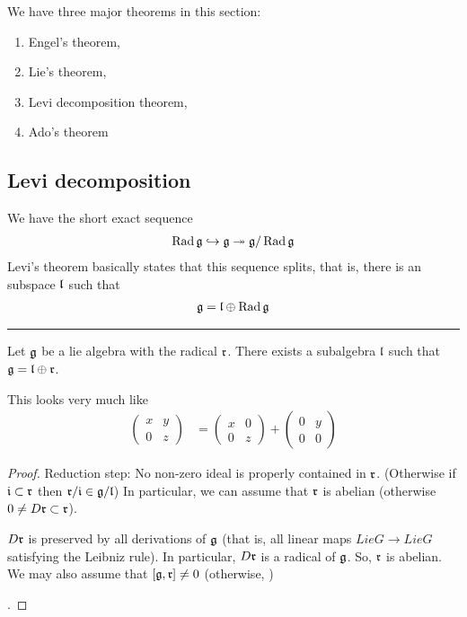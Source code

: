 We have three major theorems in this section:
\begin{enumerate}
    \makethislistcompact
    \item Engel's theorem,
    \item Lie's theorem,
    \item Levi decomposition theorem,
    \item Ado's theorem
\end{enumerate}

\subsection{Levi decomposition}
\label{sub:levi_decomposition}

We have the short exact sequence
\begin{align}
    \operatorname{Rad} \mathfrak{g} \hookrightarrow \mathfrak{g} \twoheadrightarrow \mathfrak{g}/\operatorname{Rad}\mathfrak{g}
\end{align}
Levi's theorem basically states that this sequence splits, that is, there is an subspace $\Lie{l}$ such that
\begin{align}
    \LieG = \Lie{l}\oplus\Rad\LieG
\end{align}

\hrule\vspace{1em}

\begin{theorem}
   Let $\mathfrak{g}$  be a lie algebra with the radical $\Lie r$. There exists a subalgebra $\Lie l$ such that $\Lie g = \Lie l \oplus \Lie r$.
\end{theorem}
\begin{insight}
    This looks very much like 
    \begin{align}
        \begin{pmatrix}  x& y \\ 0 & z \end{pmatrix} &= \begin{pmatrix} x & 0 \\ 0 & z \end{pmatrix} + \begin{pmatrix} 0 & y \\ 0 & 0  \end{pmatrix}
    \end{align} 
\end{insight}
\begin{proof}
    Reduction step: No non-zero ideal is properly contained in $\Lie r$. (Otherwise if $\Lie i\subset \Lie r$ then $\Lie r/\Lie i \in \Lie g/ \Lie l$) 
     In particular, we can assume that $\Lie r $ is abelian (otherwise $0\neq D\Lie r\subset \Lie r$).

     $D\Lie r$ is preserved by all derivations of $\mathfrak{g}$ (that is, all linear maps $LieG\to LieG$ satisfying the Leibniz rule). In particular, $D\Lie r$ is a radical of $\mathfrak{g}$.
     So, $\Lie r$ is abelian. We may also assume that $[\Lie g, \Lie r]\neq 0$ (otherwise, )
    
    .

    
\end{proof}

